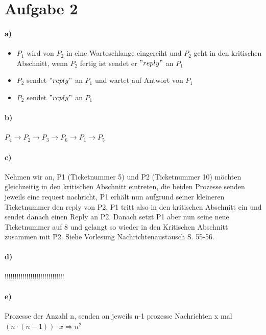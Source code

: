 \documentclass{scrartcl}
\begin{document}
	
	
	\section*{Aufgabe 2}
		\paragraph*{a)}
			\begin{itemize}
				\item $P_1$ wird von $P_2$ in eine Warteschlange eingereiht und $P_2$ geht in den kritischen Abschnitt, wenn $P_2$ fertig ist sendet er $"reply"$ an $P_1$
				\item $P_2$ sendet $"reply"$ an $P_1$ und wartet auf Antwort von $P_1$
				\item $P_2$ sendet $"reply"$ an $P_1$
			\end{itemize}
	
		\paragraph*{b)}
			$P_4 \rightarrow P_2 \rightarrow P_3 \rightarrow P_6 \rightarrow P_1 \rightarrow P_5$
	
		\paragraph*{c)}
			Nehmen wir an, P1 (Ticketnummer 5) und P2 (Ticketnummer 10) möchten gleichzeitig in den kritischen Abschnitt eintreten, die beiden Prozesse senden jeweils eine request nachricht, P1 erhält nun aufgrund seiner kleineren Ticketnummer den reply von P2. P1 tritt also in den kritischen Abschnitt ein und sendet danach einen Reply an P2. Danach setzt P1 aber nun seine neue Ticketnummer auf 8 und gelangt so wieder in den Kritischen Abschnitt zusammen mit P2. Siehe Vorlesung Nachrichtenaustausch S. 55-56.
	
		\paragraph*{d)}
			!!!!!!!!!!!!!!!!!!!!!!!!!!!!!!
	
		\paragraph*{e)}
		Prozesse der Anzahl n, senden an jeweils n-1 prozesse Nachrichten x mal\\
		$(n \cdot (n-1)) \cdot x \Rightarrow n^2$\pagebreak
	
\end{document}
